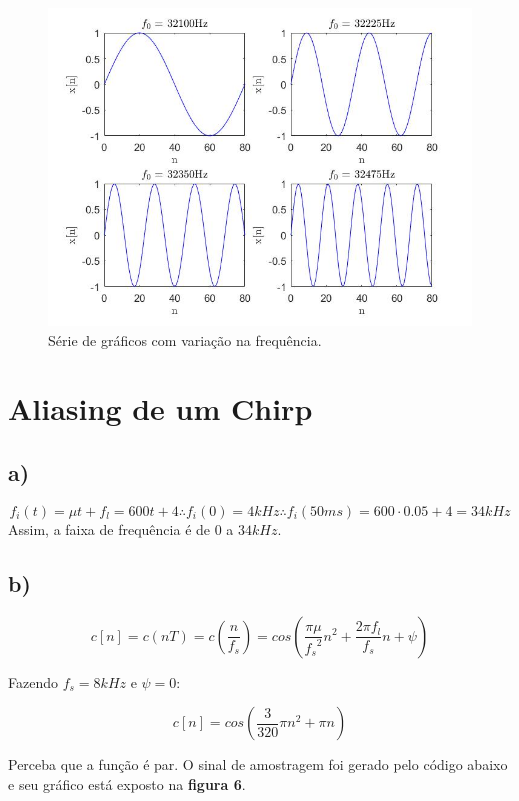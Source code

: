 \documentclass[a4paper, 12pt]{article}
\begin{document}
\begin{figure}[H]
	\centering
	\includegraphics[scale=0.5]{../Imagens/ex1/e.jpg} 
	\caption{Série de gráficos com variação na frequência.}
	\label{fig:1e}
\end{figure}


\section{Aliasing de um Chirp}

\subsection{a)}

$$f_i(t)=\mu t+f_l=600t+4 \therefore f_i(0)=4kHz \therefore f_i(50ms)=600\cdot 0.05+4=34kHz$$
Assim, a faixa de frequência é de $0$ a $34kHz$.

\subsection{b)}

$$c[n]=c(nT)=c(\frac{n}{f_s})=cos(\frac{\pi \mu}{{f_s}^2}n^2 + \frac{2\pi f_l}{f_s}n + \psi)$$

Fazendo $f_s=8kHz$ e $\psi=0$:

$$c[n] = cos(\frac{3}{320}\pi n^2 + \pi n)$$

Perceba que a função é par. O sinal de amostragem foi gerado pelo código abaixo e seu gráfico está exposto na \textbf{figura 6}. 


\end{document}
